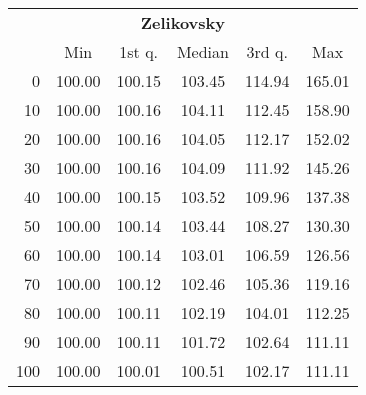 \begin{tabular}{r|ccccc}
  \multicolumn{6}{c}{{\bf Zelikovsky}} \\
  & Min & 1st q. & Median & 3rd q. & Max \\ \hline\hline
  0 & 100.00 & 100.15 & 103.45 & 114.94 & 165.01
\\ 10 & 100.00 & 100.16 & 104.11 & 112.45 & 158.90
\\ 20 & 100.00 & 100.16 & 104.05 & 112.17 & 152.02
\\ 30 & 100.00 & 100.16 & 104.09 & 111.92 & 145.26
\\ 40 & 100.00 & 100.15 & 103.52 & 109.96 & 137.38
\\ 50 & 100.00 & 100.14 & 103.44 & 108.27 & 130.30
\\ 60 & 100.00 & 100.14 & 103.01 & 106.59 & 126.56
\\ 70 & 100.00 & 100.12 & 102.46 & 105.36 & 119.16
\\ 80 & 100.00 & 100.11 & 102.19 & 104.01 & 112.25
\\ 90 & 100.00 & 100.11 & 101.72 & 102.64 & 111.11
\\ 100 & 100.00 & 100.01 & 100.51 & 102.17 & 111.11
\end{tabular}
